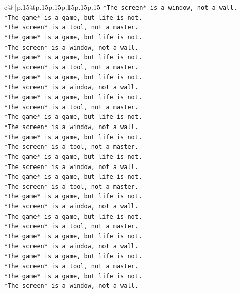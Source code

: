 \documentclass{article}
\begin{document}
{\begin{supertabular}{c@{$\;$}|p{.15\linewidth}@{}p{.15\linewidth}p{.15\linewidth}p{.15\linewidth}p{.15\linewidth}p{.15\linewidth}}
{{{\texttt{*The screen* is a window, not a wall.} \\
\texttt{*The game* is a game, but life is not.} \\
\texttt{*The screen* is a tool, not a master.} \\
\texttt{*The game* is a game, but life is not.} \\
\texttt{*The screen* is a window, not a wall.} \\
\texttt{*The game* is a game, but life is not.} \\
\texttt{*The screen* is a tool, not a master.} \\
\texttt{*The game* is a game, but life is not.} \\
\texttt{*The screen* is a window, not a wall.} \\
\texttt{*The game* is a game, but life is not.} \\
\texttt{*The screen* is a tool, not a master.} \\
\texttt{*The game* is a game, but life is not.} \\
\texttt{*The screen* is a window, not a wall.} \\
\texttt{*The game* is a game, but life is not.} \\
\texttt{*The screen* is a tool, not a master.} \\
\texttt{*The game* is a game, but life is not.} \\
\texttt{*The screen* is a window, not a wall.} \\
\texttt{*The game* is a game, but life is not.} \\
\texttt{*The screen* is a tool, not a master.} \\
\texttt{*The game* is a game, but life is not.} \\
\texttt{*The screen* is a window, not a wall.} \\
\texttt{*The game* is a game, but life is not.} \\
\texttt{*The screen* is a tool, not a master.} \\
\texttt{*The game* is a game, but life is not.} \\
\texttt{*The screen* is a window, not a wall.} \\
\texttt{*The game* is a game, but life is not.} \\
\texttt{*The screen* is a tool, not a master.} \\
\texttt{*The game* is a game, but life is not.} \\
\texttt{*The screen* is a window, not a wall.} \\
}}}
\end{supertabular}}
\end{document}
